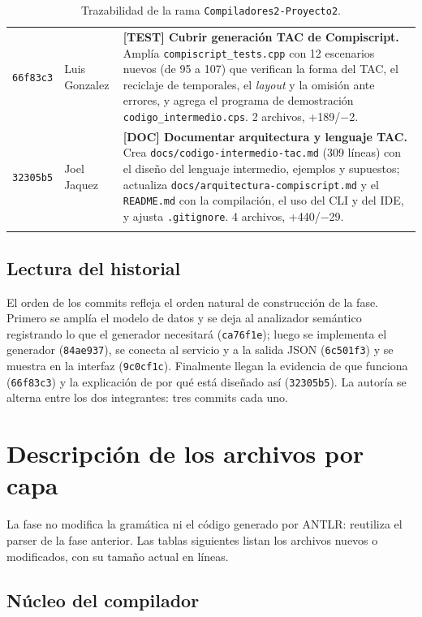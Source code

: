 \documentclass[11pt,a4paper]{article}
\begin{document}
\begin{longtable}{@{}p{1.6cm}L{2.7cm}L{9.1cm}@{}}
\texttt{66f83c3} & Luis Gonzalez &
\textbf{[TEST] Cubrir generación TAC de Compiscript.} Amplía
\texttt{compiscript\_tests.cpp} con 12 escenarios nuevos (de 95 a 107) que
verifican la forma del TAC, el reciclaje de temporales, el \emph{layout} y la
omisión ante errores, y agrega el programa de demostración
\texttt{codigo\_intermedio.cps}. 2 archivos, +189/$-$2. \\
\addlinespace

\texttt{32305b5} & Joel Jaquez &
\textbf{[DOC] Documentar arquitectura y lenguaje TAC.} Crea
\texttt{docs/codigo-intermedio-tac.md} (309 líneas) con el diseño del lenguaje
intermedio, ejemplos y supuestos; actualiza \texttt{docs/arquitectura-compiscript.md}
y el \texttt{README.md} con la compilación, el uso del CLI y del IDE, y ajusta
\texttt{.gitignore}. 4 archivos, +440/$-$29. \\
\bottomrule
\caption{Trazabilidad de la rama \texttt{Compiladores2-Proyecto2}.}
\end{longtable}

\subsection{Lectura del historial}

El orden de los commits refleja el orden natural de construcción de la fase.
Primero se amplía el modelo de datos y se deja al analizador semántico
registrando lo que el generador necesitará (\texttt{ca76f1e}); luego se
implementa el generador (\texttt{84ae937}), se conecta al servicio y a la
salida JSON (\texttt{6c501f3}) y se muestra en la interfaz (\texttt{9c0cf1c}).
Finalmente llegan la evidencia de que funciona (\texttt{66f83c3}) y la
explicación de por qué está diseñado así (\texttt{32305b5}). La autoría se
alterna entre los dos integrantes: tres commits cada uno.

\section{Descripción de los archivos por capa}

La fase no modifica la gramática ni el código generado por ANTLR: reutiliza el
parser de la fase anterior. Las tablas siguientes listan los archivos nuevos o
modificados, con su tamaño actual en líneas.

\subsection{Núcleo del compilador}
\end{document}
